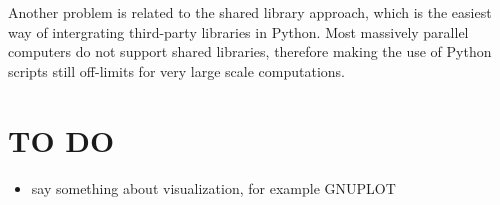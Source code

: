 \documentclass[10pt,relax]{SANDreport}
\begin{document}
Another problem is related to the shared library approach, which is the
easiest way of intergrating third-party libraries in Python. Most massively
parallel computers do not support shared libraries, therefore making the use
of Python scripts still off-limits for very large scale computations.

\section{TO DO}

\begin{itemize}
\item say something about visualization, for example GNUPLOT
\end{itemize}



\end{document}
